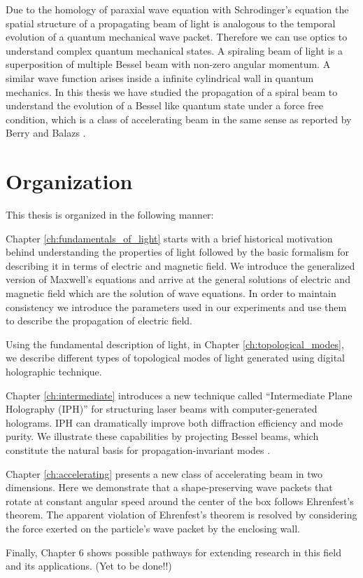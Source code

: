 Due to the homology of paraxial wave equation with Schrodinger's equation the spatial structure of a propagating beam of light is analogous to the temporal evolution of a quantum mechanical wave packet. Therefore we can use optics to understand complex quantum mechanical states. A spiraling beam of light is a superposition of multiple Bessel beam with non-zero angular momentum. A similar wave function arises inside a infinite cylindrical wall in quantum mechanics. In this thesis we have studied the propagation of a spiral beam to understand the evolution of a Bessel like quantum state under a force free condition, which is a class of accelerating beam in the same sense as reported by Berry and Balazs \cite{Berry1979}.



\section{Organization}

This thesis is organized in the following manner:

Chapter \ref{ch:fundamentals_of_light} starts with a brief historical motivation behind understanding the properties of light followed by the basic formalism for describing it in terms of electric and magnetic field. We introduce the generalized version of Maxwell's equations and arrive at the general solutions of electric and magnetic field which are the solution of wave equations. In order to maintain consistency we introduce the parameters used in our experiments and use them to describe the propagation of electric field. 

Using the fundamental description of light, in Chapter \ref{ch:topological_modes}, we describe different types of topological modes of light generated using digital holographic technique.

Chapter \ref{ch:intermediate} introduces a new technique called ``Intermediate Plane Holography (IPH)''  for structuring laser beams with computer-generated holograms. IPH can dramatically improve both diffraction efficiency and mode purity. We illustrate these capabilities by projecting Bessel beams, which constitute the natural basis for propagation-invariant modes \cite{durnin87,durnin87a}.

Chapter \ref{ch:accelerating} presents a new class of accelerating beam in two dimensions. Here we demonstrate that a shape-preserving wave packets that rotate at constant angular speed around the center of the box follows Ehrenfest's theorem. The apparent violation of Ehrenfest’s theorem is resolved by considering the force exerted on the particle’s wave packet by the enclosing wall.

Finally, Chapter 6 shows possible pathways for extending research in this field and its applications. (Yet to be done!!)
